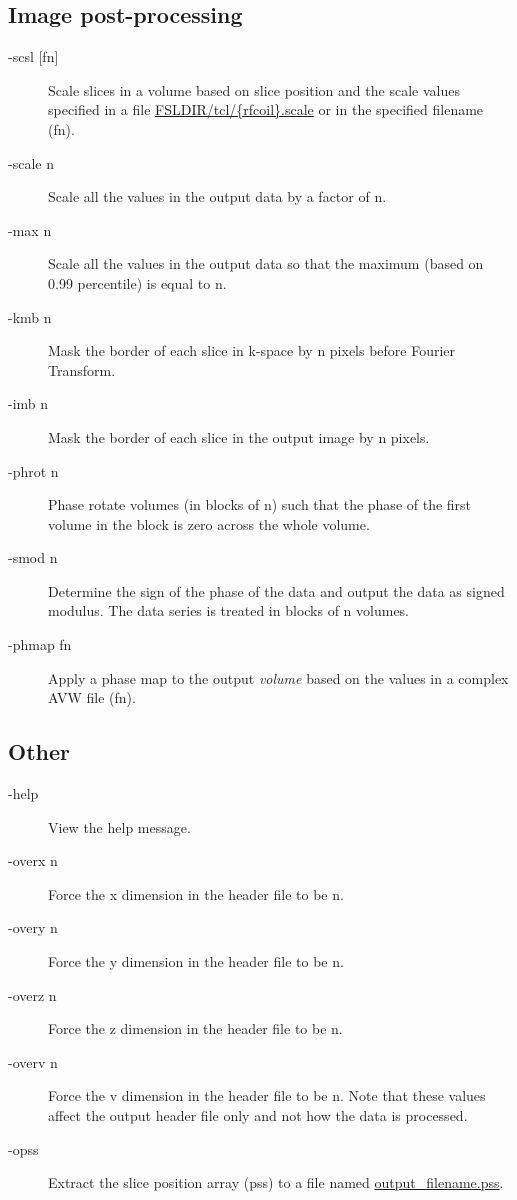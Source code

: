 \documentclass[12pt, a4paper]{article}
\begin{document}
\subsection*{Image post-processing}
\begin{description}
\item[{-scsl [fn]}] Scale slices in a volume based on slice position
  and the scale values specified in a file
  \url{FSLDIR/tcl/{rfcoil}.scale} or in the specified filename (fn).
\item[-scale n] Scale all the values in the output data by a factor of
  n.
\item[-max n] Scale all the values in the output data so that the
  maximum (based on 0.99 percentile) is equal to n.
\item[-kmb n] Mask the border of each slice in k-space by n pixels
  before Fourier Transform.
\item[-imb n] Mask the border of each slice in the output image by n pixels.
\item[-phrot n] Phase rotate volumes (in blocks of n) such that the
  phase of the first volume in the block is zero across the whole
  volume.
\item[-smod n] Determine the sign of the phase of the data and output the
  data as signed modulus.  The data series is treated in blocks of n volumes.
\item[-phmap fn] Apply a phase map to the output {\em volume} based on
  the values in a complex AVW file (fn).
\end{description}

\subsection*{Other}
\begin{description}
\item[-help] View the help message.
\item[-overx n] Force the x dimension in the header file to be n.
\item[-overy n] Force the y dimension in the header file to be n.
\item[-overz n] Force the z dimension in the header file to be n.
\item[-overv n] Force the v dimension in the header file to be n.
  Note that these values affect the output header file only and not
  how the data is processed.
\item[-opss] Extract the slice position array (pss) to a file named
  \mbox{\url{output_filename.pss}}.
\end{description}
\end{document}
